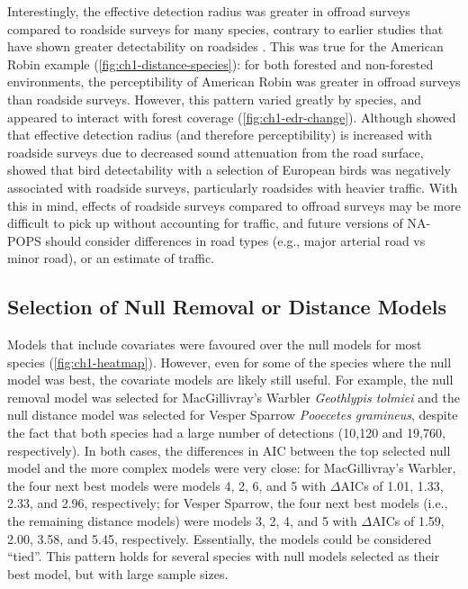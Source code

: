 \par Interestingly, the effective detection radius was greater in offroad surveys compared to roadside surveys for many species, contrary to earlier studies that have shown greater detectability on roadsides \citep{yip_sound_2017}. This was true for the American Robin example (\autoref{fig:ch1-distance-species}): for both forested and non-forested environments, the perceptibility of American Robin was greater in offroad surveys than roadside surveys. However, this pattern varied greatly by species, and appeared to interact with forest coverage (\autoref{fig:ch1-edr-change}). Although \citet{yip_sound_2017} showed that effective detection radius (and therefore perceptibility) is increased with roadside surveys due to decreased sound attenuation from the road surface, \citet{cooke_road_2020} showed that bird detectability with a selection of European birds was negatively associated with roadside surveys, particularly roadsides with heavier traffic. With this in mind, effects of roadside surveys compared to offroad surveys may be more difficult to pick up without accounting for traffic, and future versions of NA-POPS should consider differences in road types (e.g., major arterial road vs minor road), or an estimate of traffic.

\subsection{Selection of Null Removal or Distance Models}

\par Models that include covariates were favoured over the null models for most species (\autoref{fig:ch1-heatmap}). However, even for some of the species where the null model was best, the covariate models are likely still useful. For example, the null removal model was selected for MacGillivray’s Warbler \textit{Geothlypis tolmiei} and the null distance model was selected for Vesper Sparrow \textit{Pooecetes gramineus}, despite the fact that both species had a large number of detections (10,120 and 19,760, respectively). In both cases, the differences in AIC between the top selected null model and the more complex models were very close: for MacGillivray’s Warbler, the four next best models were models 4, 2, 6, and 5 with $\Delta$AICs of 1.01, 1.33, 2.33, and 2.96, respectively; for Vesper Sparrow, the four next best models (i.e., the remaining distance models) were models 3, 2, 4, and 5 with $\Delta$AICs of 1.59, 2.00, 3.58, and 5.45, respectively. Essentially, the models could be considered “tied”. This pattern holds for several species with null models selected as their best model, but with large sample sizes. 

